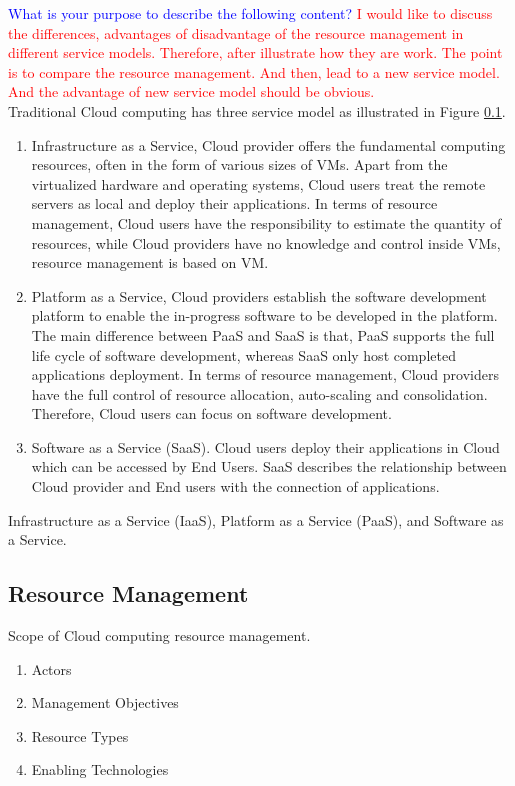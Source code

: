 \textcolor{Blue}{What is your purpose to describe the following content?}
\textcolor{Red}{
	I would like to discuss the differences, advantages of disadvantage of the resource management in different service models. Therefore, after illustrate how they are work. The point is to compare the resource management. And then, lead to a new service model. And the advantage of new service model should be obvious. 
}\\
Traditional Cloud computing has three service model as illustrated in Figure \ref{}.
\begin{enumerate}
 \item Infrastructure as a Service, Cloud provider offers the fundamental computing resources, often in the form of various sizes of VMs. Apart from the virtualized hardware and operating systems, Cloud users treat the remote servers as local and deploy their applications. In terms of resource management, Cloud users have the responsibility to estimate the quantity of resources, while Cloud providers have no knowledge and control inside VMs, resource management is based on VM. 
  \item Platform as a Service, Cloud providers establish the software development platform to enable the in-progress software to be developed in the platform.  The main difference between PaaS and SaaS is that, PaaS supports the full life cycle of software development, whereas SaaS only host completed applications deployment. In terms of resource management, Cloud providers have the full control of resource allocation, auto-scaling and consolidation. Therefore, Cloud users can focus on software development.
  \item Software as a Service (SaaS). Cloud users deploy their applications in Cloud which can be accessed by End Users. SaaS describes the relationship between Cloud provider and End users with the connection of applications.

\end{enumerate}
Infrastructure as a Service (IaaS), Platform as a Service (PaaS), and Software as a Service. 
\subsection{Resource Management}
Scope of Cloud computing resource management.
\begin{enumerate}
 \item Actors
 \item Management Objectives
 \item Resource Types
 \item Enabling Technologies
\end{enumerate}






